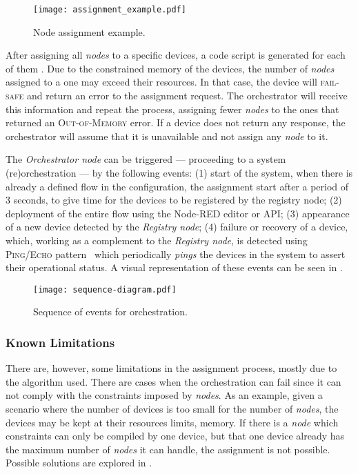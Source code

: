\begin{figure}[h]
\centering
\texttt{[image: assignment\_example.pdf]}
\caption[Node assignment example.]{Node assignment example.}\label{fig:assigment_example}
\end{figure}

After assigning all \textit{nodes} to a specific devices, a code script is generated for each of them . Due to the constrained memory of the devices, the number of \textit{nodes} assigned to a one may exceed their resources. In that case, the device will \textsc{fail-safe} and return an error to the assignment request. The orchestrator will receive this information and repeat the process, assigning fewer \textit{nodes} to the ones that returned an \textsc{Out-of-Memory} error. If a device does not return any response, the orchestrator will assume that it is unavailable and not assign any \textit{node} to it.

The \textit{Orchestrator node} can be triggered --- proceeding to a system (re)orchestration --- by the following events: (1) start of the system, when there is already a defined flow in the configuration, the assignment start after a period of 3 seconds, to give time for the devices to be registered by the registry node; (2) deployment of the entire flow using the Node-RED editor or API; (3) appearance of a new device detected by the \textit{Registry node}; (4) failure or recovery of a device, which, working as a complement to the \textit{Registry node}, is detected using \textsc{Ping/Echo} pattern~\cite{Scott2009} which periodically \textit{pings} the devices in the system to assert their operational status. A visual representation of these events can be seen in . 

\begin{figure}[h]
\centering
\texttt{[image: sequence-diagram.pdf]}
\caption[Sequence of events for orchestration.]{Sequence of events for orchestration.}\label{fig:sequence_diagram}
\end{figure}

\subsubsection{Known Limitations}\label{sec:solution_known_limitations}

There are, however, some limitations in the assignment process, mostly due to the algorithm used. There are cases when the orchestration can fail since it can not comply with the constraints imposed by \textit{nodes}. As an example, given a scenario where the number of devices is too small for the number of \textit{nodes}, the devices may be kept at their resources limits, \ie memory. If there is a \textit{node} which constraints can only be compiled by one device, but that one device already has the maximum number of \textit{nodes} it can handle, the assignment is not possible. Possible solutions are explored in .

